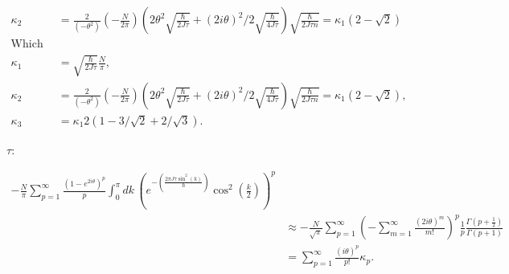 \documentclass{article}
\begin{document}
\begin{align*}
    \kappa_2 & = \frac{2}{(-\theta^2)} \left(-\frac{N}{2\pi}\right)(2\theta^2 \sqrt{\frac{\hbar}{2J\tau}}+(2i\theta)^2/2 \sqrt{\frac{\hbar}{4J\tau}}) \sqrt{\frac{\hbar}{2J\tau n}}=\kappa_1 (2-\sqrt{2})  \\
    \text{Which yields:}                                                                                                                                                                                   \\
    \kappa_1 & = \sqrt{\frac{\hbar}{2J\tau}} \frac{N}{\pi},                                                                                                                                                \\
    \kappa_2 & = \frac{2}{(-\theta^2)} \left(-\frac{N}{2\pi}\right)(2\theta^2 \sqrt{\frac{\hbar}{2J\tau}}+(2i\theta)^2/2 \sqrt{\frac{\hbar}{4J\tau}}) \sqrt{\frac{\hbar}{2J\tau n}}=\kappa_1 (2-\sqrt{2}), \\
    \kappa_3 & = \kappa_1 2(1-3/\sqrt{2}+2/\sqrt{3}).
\end{align*}

 $\tau$:

\begin{align*}
    -\frac{N}{\pi} \sum_{p=1}^{\infty}\frac{(1-e^{2i\theta})^p}{p} \int_0^{\pi} dk \, \left(e^{-\left(\frac{2\pi J\tau \sin^2 (k)}{\hbar}\right)} \cos^2 \left(\frac{k}{2}\right)\right)^p \\
     & \approx -\frac{N}{\sqrt{\pi}} \sum_{p=1}^{\infty} \left(-\sum_{m=1}^{\infty}\frac{(2i\theta)^m}{m!}\right)^p \frac{1}{p} \frac{\Gamma\left(p+\frac{1}{2}\right)}{\Gamma(p+1)}       \\
     & = \sum_{p=1}^{\infty} \frac{(i\theta)^p}{p!} \kappa_p.
\end{align*}
\end{document}
